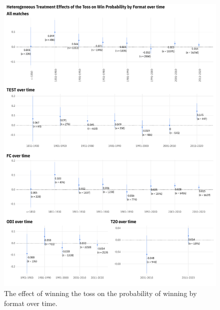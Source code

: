 \documentclass[12pt, letterpaper]{article}
\begin{document}
\begin{figure}[b]
  \centering
  \includegraphics[scale=.5]{output/reduced_form_by_format_overtime.pdf}
  \caption{The effect of winning the toss on the probability of winning by format over time.}
  \label{fig:rf_het_TE2}
\end{figure}
\end{document}
